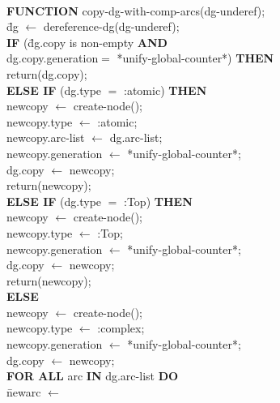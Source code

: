 \vspace*{4mm}
\begin{footnotesize}
  \\ 
\vspace*{-3mm}
\begin{tabbing}
{\bf FUNCTION} copy-dg-with-comp-arcs(dg-underef); \\
\hspace*{2mm} \= dg $\leftarrow$ dereference-dg(dg-underef); \\
\> {\bf IF} (\= dg.copy is non-empty {\bf AND} \\
\>           \> dg.copy.generation\footnotemark $=$
*unify-global-counter*) {\bf THEN} \\
\> \> return(dg.copy);\footnotemark \\
\> {\bf ELSE IF} (dg.type $=$ :atomic) {\bf THEN} \\
\> \>    newcopy $\leftarrow$ create-node();\footnotemark \\
\> \>    newcopy.type $\leftarrow$ :atomic; \\
\> \>    newcopy.arc-list $\leftarrow$ dg.arc-list; \\
\> \>    newcopy.generation $\leftarrow$ *unify-global-counter*;   \\
\> \>    dg.copy $\leftarrow$ newcopy; \\
\> \>    return(newcopy); \\
\> {\bf ELSE IF} (dg.type $=$ :Top) {\bf THEN} \\
\> \>    newcopy $\leftarrow$ create-node(); \\
\> \>    newcopy.type $\leftarrow$ :Top; \\
\> \>    newcopy.generation $\leftarrow$ *unify-global-counter*; \\
\> \>    dg.copy $\leftarrow$ newcopy; \\
\> \>    return(newcopy); \\
\> {\bf ELSE} \\
\> \>     newcopy $\leftarrow$ create-node(); \\
\> \>     newcopy.type $\leftarrow$ :complex; \\
\> \>     newcopy.generation $\leftarrow$ *unify-global-counter*; \\
\> \>     dg.copy $\leftarrow$ newcopy;\footnotemark \\
\> \>     {\bf FOR ALL} arc {\bf IN} dg.arc-list {\bf DO} \\
\> \>  \hspace*{4mm} \=  newarc $\leftarrow$

\end{tabbing}
\end{footnotesize}
